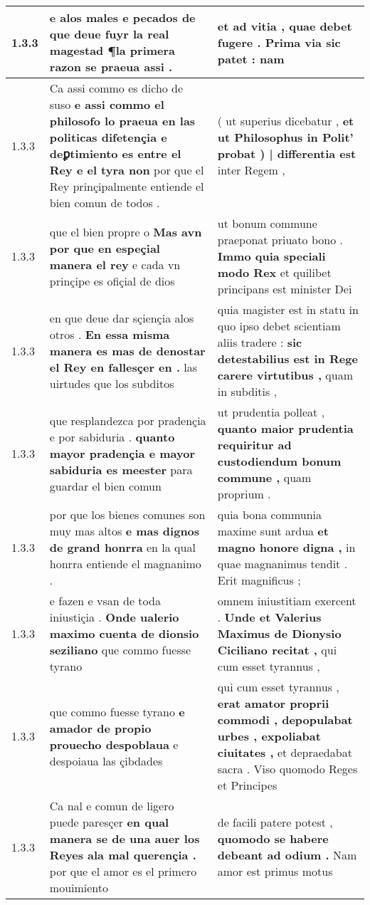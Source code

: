 \begin{tabular}{|p{1cm}|p{6.5cm}|p{6.5cm}|}
1.3.3 & e alos males e pecados \textbf{ de que deue fuyr la real magestad } ¶la primera razon se praeua assi . & et ad vitia , \textbf{ quae debet fugere . Prima via sic patet : } nam \\\hline
1.3.3 & Ca assi commo es dicho de suso \textbf{ e assi commo el philosofo lo praeua en las politicas difetençia e deꝑtimiento es entre el Rey e el tyra non } por que el Rey prinçipalmente entiende el bien comun de todos . & ( ut superius dicebatur , \textbf{ et ut Philosophus in Polit’ probat ) | differentia est } inter Regem , \\\hline
1.3.3 & que el bien propre o \textbf{ Mas avn por que en espeçial manera el rey } e cada vn prinçipe es ofiçial de dios & ut bonum commune praeponat priuato bono . \textbf{ Immo quia speciali modo Rex } et quilibet principans est minister Dei \\\hline
1.3.3 & en que deue dar sçiençia alos otros . \textbf{ En essa misma manera es mas de denostar el Rey en fallesçer en . } las uirtudes que los subditos & quia magister est in statu in quo ipso debet scientiam aliis tradere : \textbf{ sic detestabilius est in Rege carere virtutibus , } quam in subditis , \\\hline
1.3.3 & que resplandezca por pradençia e por sabiduria . \textbf{ quanto mayor pradençia e mayor sabiduria es meester } para guardar el bien comun & ut prudentia polleat , \textbf{ quanto maior prudentia requiritur ad custodiendum bonum commune , } quam proprium . \\\hline
1.3.3 & por que los bienes comunes son muy mas altos \textbf{ e mas dignos de grand honrra } en la qual honrra entiende el magnanimo . & quia bona communia maxime sunt ardua \textbf{ et magno honore digna , } in quae magnanimus tendit . Erit magnificus ; \\\hline
1.3.3 & e fazen e vsan de toda iniustiçia . \textbf{ Onde ualerio maximo cuenta de dionsio seziliano } que commo fuesse tyrano & omnem iniustitiam exercent . \textbf{ Unde et Valerius Maximus de Dionysio Ciciliano recitat , } qui cum esset tyrannus , \\\hline
1.3.3 & que commo fuesse tyrano \textbf{ e amador de propio prouecho despoblaua } e despoiaua las çibdades & qui cum esset tyrannus , \textbf{ erat amator proprii commodi , depopulabat urbes , expoliabat ciuitates , } et depraedabat sacra . Viso quomodo Reges et Principes \\\hline
1.3.3 & Ca nal e comun de ligero puede paresçer \textbf{ en qual manera se de una auer los Reyes ala mal querençia . } por que el amor es el primero mouimiento & de facili patere potest , \textbf{ quomodo se habere debeant ad odium . } Nam amor est primus motus \\\hline

\end{tabular}

